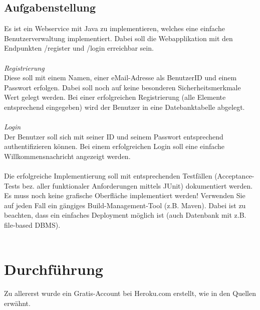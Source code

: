 \documentclass[letterpaper, 12pt]{article}
\let\tempsection\section
\renewcommand\section[1]{\vspace{-0.3cm}\tempsection{#1}\vspace{-0.3cm}}
\let\tempsubsection\subsection
\renewcommand\subsection[1]{\vspace{0cm}\tempsubsection{#1}\vspace{0cm}}
\begin{document}
\subsection{Aufgabenstellung}
Es ist ein Webservice mit Java zu implementieren, welches eine einfache Benutzerverwaltung implementiert. Dabei soll die Webapplikation mit den Endpunkten /register und /login erreichbar sein. \\ \\
\textit{Registrierung} \\
Diese soll mit einem Namen, einer eMail-Adresse als BenutzerID und einem Passwort erfolgen. Dabei soll noch auf keine besonderen Sicherheitsmerkmale Wert gelegt werden. Bei einer erfolgreichen Registrierung (alle Elemente entsprechend eingegeben) wird der Benutzer in eine Datebanktabelle abgelegt. \\ \\
\textit{Login} \\
Der Benutzer soll sich mit seiner ID und seinem Passwort entsprechend authentifizieren können. Bei einem erfolgreichen Login soll eine einfache Willkommensnachricht angezeigt werden. \\ \\
Die erfolgreiche Implementierung soll mit entsprechenden Testfällen (Acceptance-Tests bez. aller funktionaler Anforderungen mittels JUnit) dokumentiert werden. Es muss noch keine grafische Oberfläche implementiert werden! Verwenden Sie auf jeden Fall ein gängiges Build-Management-Tool (z.B. Maven). Dabei ist zu beachten, dass ein einfaches Deployment möglich ist (auch Datenbank mit z.B. file-based DBMS). \\ \\
\cite{eins} \cite{zwei} \cite{drei} \cite{vier}

\newpage

\section{Durchführung}

Zu allererst wurde ein Gratis-Account bei Heroku.com erstellt, wie in den Quellen erwähnt.

\newpage



\lstlistoflistings
\listoffigures
\end{document}

